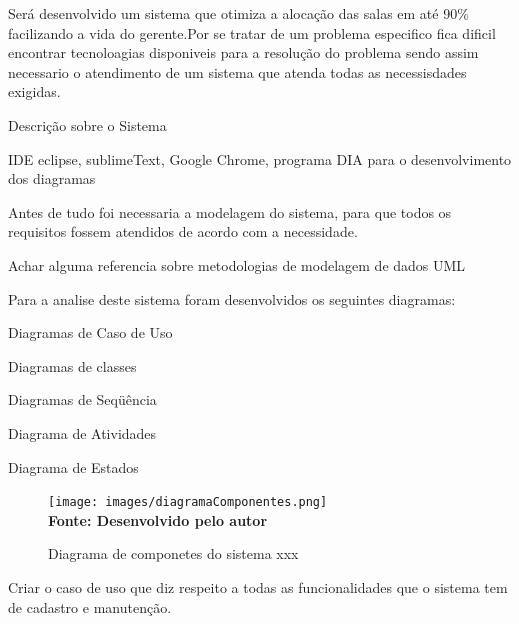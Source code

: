 


Será desenvolvido um sistema que otimiza a alocação das salas em até 90\% facilizando a vida do gerente.Por se tratar de um problema especifico fica dificil encontrar tecnoloagias disponiveis para a resolução do problema sendo assim necessario o atendimento de um sistema que atenda todas as necessisdades exigidas.

	
	Descrição sobre o Sistema


	IDE eclipse, sublimeText, Google Chrome, programa DIA para o desenvolvimento dos diagramas\cite{alterar}


	Antes de tudo foi necessaria a modelagem do sistema, para que todos os requisitos fossem atendidos de acordo com a necessidade.\par

	Achar alguma referencia sobre metodologias de modelagem de dados UML\par\cite{alterar}

	Para a analise deste sistema foram desenvolvidos os seguintes diagramas:\par\cite{alterar}
	
	Diagramas de Caso de Uso\par
	Diagramas de classes\par
	Diagramas de Seqüência\par
	Diagrama de Atividades\par
	Diagrama de Estados\par
\begin{figure}[!htb]
   \caption[Diagrama de componetes do sistema xxx]{Diagrama de componetes do sistema xxx}
   \label{fig:figura1}
   \centering
   \texttt{[image: images/diagramaComponentes.png]}
   \\ \textbf{\footnotesize Fonte: Desenvolvido pelo autor}
\end{figure}




	Criar o caso de uso que diz respeito a todas as funcionalidades que o sistema tem de cadastro e manutenção.\par\cite{alterar}


